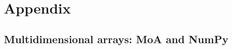 \documentclass[a4paper,12pt]{article}
\begin{document}
\section*{Appendix}

\subsection*{Multidimensional arrays: MoA and NumPy}

\begin{comment}
\newcommand{\MoADefinition}[1]{
  \begin{itemize}
  #1
  \end{itemize}
}
\newcommand{\MoAItem}[3]{\item {#1}
  \begin{description}
  \item[MoA:] {#2}
  \item[NumPy:] {#3}
  \end{description}
}  
\end{comment}
\newcommand{\MoADefinition}[1]{
\renewcommand{\arraystretch}{2}
\begin{longtable}{| p{.5\textwidth} | p{.5\textwidth} |}
#1
\end{longtable}
\renewcommand{\arraystretch}{1}
}
\newcommand{\MoAItem}[3]{
\multicolumn2{l}{
  \begin{minipage}[l]{0.9\linewidth} \vspace{2ex}
  $\bullet$ #1\\[0.1ex]
  \end{minipage}
}\\\hline
\begin{minipage}[l]{0.95\linewidth}
{#2}  
\end{minipage}
&
\begin{minipage}[l]{0.95\linewidth}
{#3}  
\end{minipage}\\\hline
}
\end{document}
